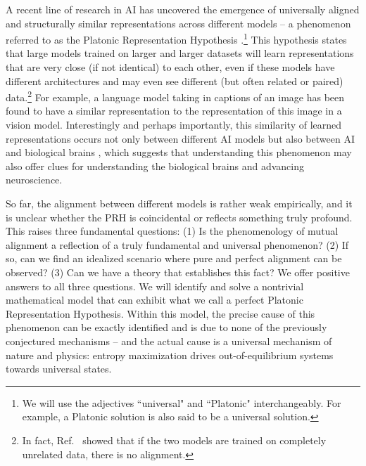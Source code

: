 \documentclass[11pt]{article}
\theoremstyle{plain}
\begin{document}
A recent line of research in AI has uncovered the emergence of universally aligned and structurally similar representations across different models -- a phenomenon referred to as the Platonic Representation Hypothesis \cite{huh2024platonic}.\footnote{We will use the adjectives ``universal" and ``Platonic" interchangeably. For example, a Platonic solution is also said to be a universal solution.} This hypothesis states that large models trained on larger and larger datasets will learn representations that are very close (if not identical) to each other, even if these models have different architectures and may even see different (but often related or paired) data.\footnote{In fact, Ref.~\cite{tjandrasuwita2025understanding} showed that if the two models are trained on completely unrelated data, there is no alignment.} For example, a language model taking in captions of an image has been found to have a similar representation to the representation of this image in a vision model. Interestingly and perhaps importantly, this similarity of learned representations occurs not only between different AI models but also between AI and biological brains \cite{yamins2014performance}, which suggests that understanding this phenomenon may also offer clues for understanding the biological brains and advancing neuroscience.

So far, the alignment between different models is rather weak empirically, and it is unclear whether the PRH is coincidental or reflects something truly profound. This raises three fundamental questions: (1) Is the phenomenology of mutual alignment a reflection of a truly fundamental and universal phenomenon? (2) If so, can we find an idealized scenario where pure and perfect alignment can be observed? (3) Can we have a theory that establishes this fact? We offer positive answers to all three questions. We will identify and solve a nontrivial mathematical model that can exhibit what we call a perfect Platonic Representation Hypothesis. Within this model, the precise cause of this phenomenon can be exactly identified and is due to none of the previously conjectured mechanisms -- and the actual cause is a universal mechanism of nature and physics: entropy maximization drives out-of-equilibrium systems towards universal states.
\end{document}
